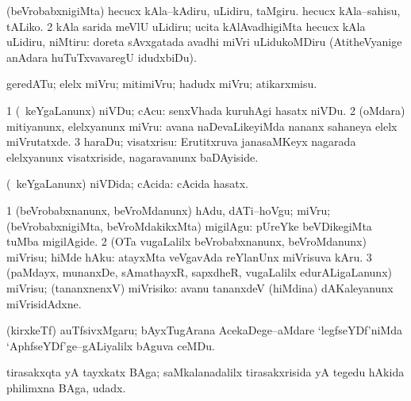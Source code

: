 \bentry
{}
\gl{\sakirx}
\bmng
\bnum
{} (beVrobabxnigiMta) 
\banum
{} hecucx kAla--kAdiru, uLidiru, taMgiru. 
 hecucx kAla--sahisu, tALiko. 
\eanum
\numie
\num{2} kAla sarida meVlU uLidiru; ucita kAlAvadhigiMta hecucx kAla uLidiru, niMtiru:  doreta sAvxgatada avadhi miVri uLidukoMDiru (AtitheVyanige anAdara huTuTxvavaregU idudxbiDu). 
\enum
\emng
\eentry

\bentry
{}
\gl{\sakirx}
\bmng
geredATu; elelx miVru; mitimiVru; hadudx miVru; atikarxmisu. 
\emng
\eentry

\bentry
{}
\gl{\sakirx}
\bmng
\bnum
\num{1} (\kanmu\ keYgaLanunx) niVDu; cAcu:  senxVhada kuruhAgi hasatx niVDu. 
\num{2} (oMdara) mitiyanunx, elelxyanunx miVru:  avana naDevaLikeyiMda nananx sahaneya elelx miVrutatxde. 
\num{3} haraDu; visatxrisu:  Erutitxruva janasaMKeyx nagarada elelxyanunx visatxriside, nagaravanunx baDAyiside. 
\enum
\emng
\eentry

\bentry
{}
\gl{\gu}
\bmng
(\kanmu\ keYgaLanunx) niVDida; cAcida:  cAcida hasatx. 
\emng
\eentry

\bentry
{}
\gl{\sakirx}
\bmng
\bnum
\num{1} (beVrobabxnanunx, beVroMdanunx) hAdu, dATi--hoVgu; miVru; (beVrobabxnigiMta, beVroMdakikxMta) migilAgu:  pUreYke beVDikegiMta tuMba migilAgide. 
\num{2} (OTa \mo vugaLalilx beVrobabxnanunx, beVroMdanunx) miVrisu; hiMde hAku:  atayxMta veVgavAda reYlanUnx miVrisuva kAru. 
\num{3} (paMdayx, munanxDe, sAmathayxR, sapxdheR, \mo vugaLalilx edurALigaLanunx) miVrisu; (tananxnenxV) miVrisiko:  avanu tananxdeV (hiMdina) dAKaleyanunx miVrisidAdxne. 
\enum
\emng
\eentry

\bentry
{}
\gl{\nA}
\bmng
(kirxkeTf) auTfsivxMgaru; bAyxTugArana AcekaDege--aMdare `legfseYDf'niMda `AphfseYDf'ge--gALiyalilx bAguva ceMDu. 
\emng
\eentry

\bentry
{}
\gl{\nA}
\bmng
tirasakxqta yA tayxkatx BAga; saMkalanadalilx tirasakxrisida yA tegedu hAkida philimxna BAga, udadx. 
\emng
\eentry

